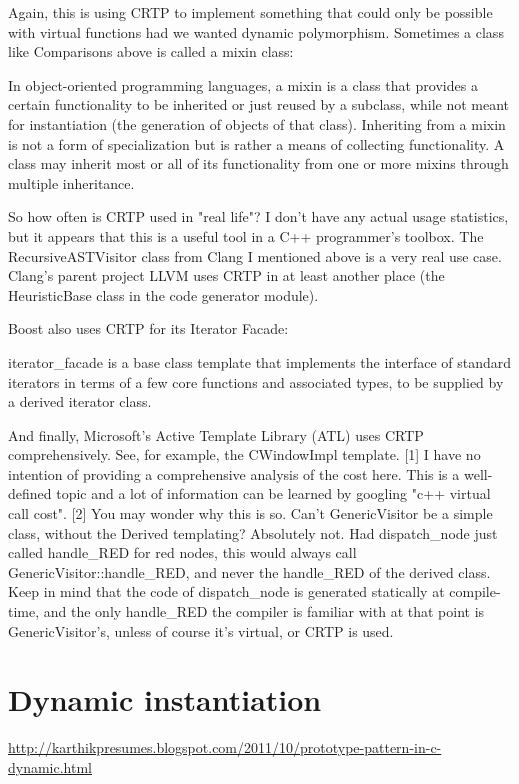 \documentclass{book}
\begin{document}
Again, this is using CRTP to implement something that could only be possible with virtual functions had we wanted dynamic polymorphism. 
Sometimes a class like Comparisons above is called a mixin class:

    In object-oriented programming languages, a mixin is a class that provides a certain functionality to be inherited or just reused by a subclass, 
    while not meant for instantiation (the generation of objects of that class). 
    Inheriting from a mixin is not a form of specialization but is rather a means of collecting functionality. 
    A class may inherit most or all of its functionality from one or more mixins through multiple inheritance.

So how often is CRTP used in "real life"? I don't have any actual usage statistics, but it appears that this is a useful tool in a C++ programmer's toolbox. 
The RecursiveASTVisitor class from Clang I mentioned above is a very real use case. 
Clang's parent project LLVM uses CRTP in at least another place (the HeuristicBase class in the code generator module).

Boost also uses CRTP for its Iterator Facade:

    iterator\_facade is a base class template that implements the interface of standard iterators in terms of a few core functions and associated types, to be supplied by a derived iterator class.

And finally, Microsoft's Active Template Library (ATL) uses CRTP comprehensively. See, for example, the CWindowImpl template.
[1]	I have no intention of providing a comprehensive analysis of the cost here. 
    This is a well-defined topic and a lot of information can be learned by googling "c++ virtual call cost".
[2]	You may wonder why this is so. Can't GenericVisitor be a simple class, without the Derived templating? Absolutely not. 
    Had dispatch\_node just called handle\_RED for red nodes, this would always call GenericVisitor::handle\_RED, and never the handle\_RED of the derived class. 
    Keep in mind that the code of dispatch\_node is generated statically at compile-time, and the only handle\_RED the compiler is familiar with at that point is GenericVisitor's, 
    unless of course it's virtual, or CRTP is used.




\chapter{Dynamic instantiation}\label{DI}
\url{http://karthikpresumes.blogspot.com/2011/10/prototype-pattern-in-c-dynamic.html}
\end{document}
